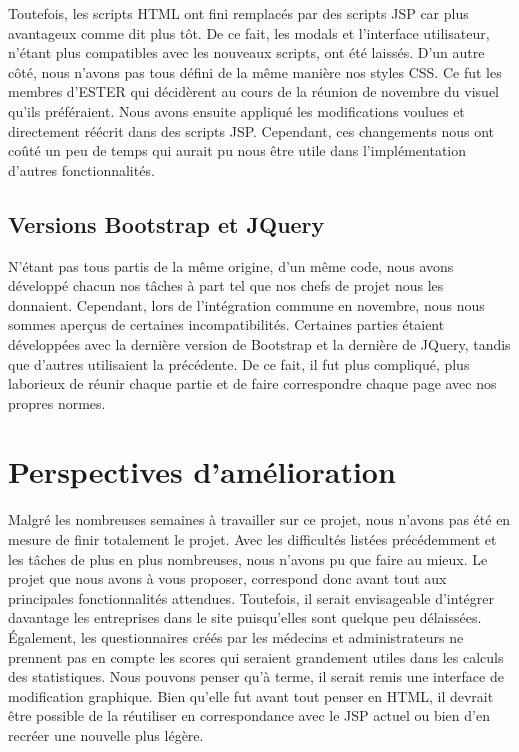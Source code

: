 Toutefois, les scripts HTML ont fini remplacés par des scripts JSP car plus avantageux comme dit plus tôt. De ce fait, les modals et l'interface utilisateur, n'étant plus compatibles avec les nouveaux scripts, ont été laissés. D'un autre côté, nous n'avons pas tous défini de la même manière nos styles CSS. Ce fut les membres d'ESTER qui décidèrent au cours de la réunion de novembre du visuel qu'ils préféraient. Nous avons ensuite appliqué les modifications voulues et directement réécrit dans des scripts JSP. Cependant, ces changements nous ont coûté un peu de temps qui aurait pu nous être utile dans l'implémentation d'autres fonctionnalités.

\subsection{Versions Bootstrap et JQuery}

N'étant pas tous partis de la même origine, d'un même code, nous avons développé chacun nos tâches à part tel que nos chefs de projet nous les donnaient. Cependant, lors de l'intégration commune en novembre, nous nous sommes aperçus de certaines incompatibilités. Certaines parties étaient développées avec la dernière version de Bootstrap et la dernière de JQuery, tandis que d'autres utilisaient la précédente. 
De ce fait, il fut plus compliqué, plus laborieux de réunir chaque partie et de faire correspondre chaque page avec nos propres normes. 


\section{Perspectives d'amélioration}

Malgré les nombreuses semaines à travailler sur ce projet, nous n'avons pas été en mesure de finir totalement le projet. Avec les difficultés listées précédemment et les tâches de plus en plus nombreuses, nous n'avons pu que faire au mieux. 
Le projet que nous avons à vous proposer, correspond donc avant tout aux principales fonctionnalités attendues. Toutefois, il serait envisageable d'intégrer davantage les entreprises dans le site puisqu'elles sont quelque peu délaissées. 
Également, les questionnaires créés par les médecins et administrateurs ne prennent pas en compte les scores qui seraient grandement utiles dans les calculs des statistiques. 
Nous pouvons penser qu'à terme, il serait remis une interface de modification graphique. Bien qu'elle fut avant tout penser en HTML, il devrait être possible de la réutiliser en correspondance avec le JSP actuel ou bien d'en recréer une nouvelle plus légère. 
